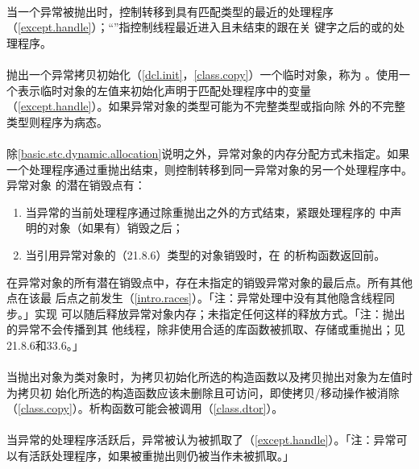 \paragraph{}
当一个异常被抛出时，控制转移到具有匹配类型的最近的处理程序
（\ref{except.handle}）；``''指控制线程最近进入且未结束的跟在关
键字之后的或的处理程序。

\paragraph{}
抛出一个异常拷贝初始化（\ref{dcl.init}，\ref{class.copy}）一个临时对象，称为
。使用一个表示临时对象的左值来初始化声明于匹配处理程序中的变量
（\ref{except.handle}）。如果异常对象的类型可能为不完整类型或指向除
外的不完整类型则程序为病态。

\paragraph{}
除\ref{basic.stc.dynamic.allocation}说明之外，异常对象的内存分配方式未指定。如果
一个处理程序通过重抛出结束，则控制转移到同一异常对象的另一个处理程序中。异常对象
的潜在销毁点有：
\begin{enumerate}
  \item{当异常的当前处理程序通过除重抛出之外的方式结束，紧跟处理程序的
    中声明的对象（如果有）销毁之后；}
  \item{当引用异常对象的（21.8.6）类型的对象销毁时，在
    的析构函数返回前。}
\end{enumerate}
在异常对象的所有潜在销毁点中，存在未指定的销毁异常对象的最后点。所有其他点在该最
后点之前发生（\ref{intro.races}）。「注：异常处理中没有其他隐含线程同步。」实现
可以随后释放异常对象内存；未指定任何这样的释放方式。「注：抛出的异常不会传播到其
他线程，除非使用合适的库函数被抓取、存储或重抛出；见21.8.6和33.6。」

\paragraph{}
当抛出对象为类对象时，为拷贝初始化所选的构造函数以及拷贝抛出对象为左值时为拷贝初
始化所选的构造函数应该未删除且可访问，即使拷贝/移动操作被消除
（\ref{class.copy}）。析构函数可能会被调用（\ref{class.dtor}）。

\paragraph{}
当异常的处理程序活跃后，异常被认为被抓取了（\ref{except.handle}）。「注：异常可
以有活跃处理程序，如果被重抛出则仍被当作未被抓取。」

